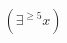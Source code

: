 \documentclass[preview]{standalone}
\begin{document}
\begin{align*}
(\exists^{\ge 5} x)
\end{align*}
\end{document}
